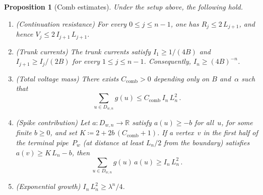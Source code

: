 \documentclass[11pt]{amsart}
\theoremstyle{plain}
\newtheorem{proposition}[theorem]{Proposition}
\theoremstyle{definition}
\newcommand{\R}{\mathbb{R}}
\begin{document}
	\begin{proposition}[Comb estimates]\label{prop:comb-estimates}
		Under the setup above, the following hold.
		\begin{enumerate}[label=\textup{(\alph*)}]
			\item \textup{(Continuation resistance)}\; For every $0\leq j\leq n{-}1$, one has $R_j\leq 2\,L_{j+1}$, and hence $V_j\leq 2\,I_{j+1}\,L_{j+1}$.
			\item \textup{(Trunk currents)}\; The trunk currents satisfy $I_1\geq 1/(4B)$ and $I_{j+1}\geq I_j/(2B)$ for every $1\leq j\leq n{-}1$. Consequently, $I_n\geq(4B)^{-n}$.
			\item \textup{(Total voltage mass)}\; There exists $C_{\mathrm{comb}}>0$ depending only on $B$ and~$\alpha$ such that
			\[
			\sum_{u\in D_{w,n}}g(u)\leq C_{\mathrm{comb}}\,I_n\,L_n^2\,.
			\]
			\item \textup{(Spike contribution)}\; Let $a\colon D_{w,n}\to\R$ satisfy $a(u)\geq -b$ for all~$u$, for some finite $b\geq 0$, and set $K\coloneqq 2+2b\,(C_{\mathrm{comb}}+1)$. If a vertex~$v$ in the first half of the terminal pipe~$P_w$ (at distance at least $L_n/2$ from the boundary) satisfies $a(v)\geq K\,L_n-b$, then
			\[
			\sum_{u\in D_{w,n}}g(u)\,a(u)\geq I_n\,L_n^2\,.
			\]
			\item \textup{(Exponential growth)}\; $I_n\,L_n^2\geq\lambda^n/4$.
		\end{enumerate}
	\end{proposition}
	
\end{document}
